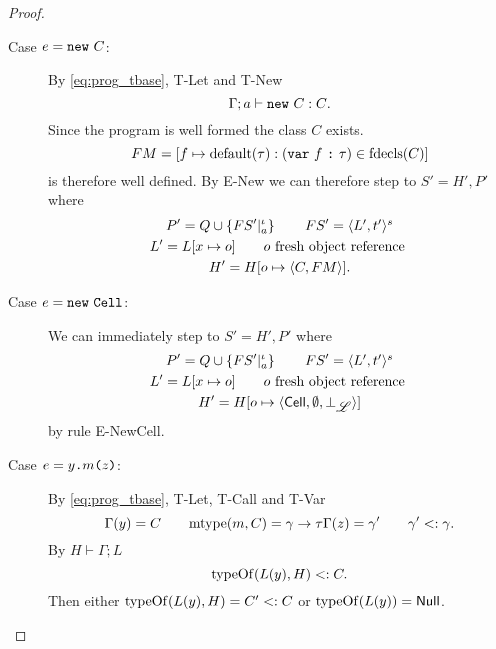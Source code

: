 \begin{proof}
\begin{description}
\begin{description}
        \item[Case $e = \mbox{\mdseries\texttt{new}~$C$}$:]
          By \eqref{eq:prog_tbase}, {\sc T-Let} and {\sc T-New}
          \begin{equation*}
            \mbox{$\Gamma;a\vdash\mbox{\mdseries\texttt{new}~$C$}:C$}.
          \end{equation*}
          Since the program is well formed the class $C$ exists. 
          \begin{equation*}
            FM = [f \mapsto \mbox{$\mathrm{default}$}(\tau): (\mbox{\mdseries\texttt{var}~$f$~\texttt{:}~$\tau$}) \in \mbox{$\mathrm{fdecls}$}(C)]
          \end{equation*}
          is therefore well defined. By {\sc E-New} we can therefore step to $S'
          = H', P'$ where
          \begin{equation*}
            \begin{gathered}
              P' = Q \cup \left\{FS'|_a^\iota \right\} \quad\quad FS' = \mbox{$\langle L',
              t' \rangle^s$} \\
              L' = L[x \mapsto o] \quad\quad o \text{ fresh object reference } \\
              H' = H[o \mapsto \mbox{$\langle C, FM \rangle$}].
            \end{gathered}
          \end{equation*}
          \contradiction

        \item[Case $e = \mbox{\mdseries\texttt{new}~\texttt{Cell}}$:]
          We can immediately step to $S' = H', P'$ where
          \begin{equation*}
            \begin{gathered}
              P' = Q \cup \left\{FS'|_a^\iota \right\} \quad\quad FS' = \mbox{$\langle L',
              t' \rangle^s$} \\
              L' = L[x \mapsto o] \quad\quad o \text{ fresh object reference } \\
              H' = H[o \mapsto \mbox{$\langle \mbox{$\mathsf{Cell}$}{}, \emptyset, \bot_{\mbox{$\mathscr{L}$}} \rangle$}]
            \end{gathered}
          \end{equation*}
          by rule {\sc E-NewCell}. \contradiction
      
        \item[Case $e = \mbox{\mdseries$y$\texttt{.}$m$\texttt{(}$z$\texttt{)}}$:]
          By \eqref{eq:prog_tbase}, {\sc T-Let}, {\sc T-Call} and {\sc T-Var}
          \begin{equation*}
            \Gamma(y) = C \quad\quad \mbox{$\mathrm{mtype}$}(m, C) = \gamma \to \tau \\
            \Gamma(z) = \gamma' \quad\quad \gamma' <: \gamma.
          \end{equation*}
          By $H \vdash \Gamma;L$ 
          \begin{equation*}
            \mbox{$\mathrm{typeOf}$}(L(y), H) <: C.
          \end{equation*}
          Then either $\mbox{$\mathrm{typeOf}$}(L(y), H) = C' <: C$ or $\mbox{$\mathrm{typeOf}$}(L(y)) =
          \mbox{$\mathsf{Null}$}$.


\end{description}
\end{description}
\end{proof}
